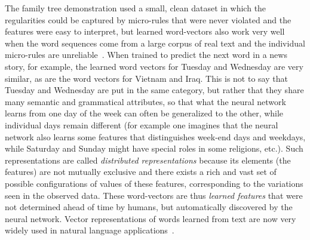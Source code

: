 \documentclass[10pts]{article}
\begin{document}
The family tree demonstration used a small, clean dataset in which the
regularities could be captured by micro-rules that were never violated
and the features were easy to interpret, but learned word-vectors also
work very well when the word sequences come from a large corpus of
real text and the individual micro-rules are
unreliable~\citep{BenDucVin01-short}. When trained to predict the next
word in a news story, for example, the learned word vectors for
Tuesday and Wednesday are very similar, as are the word vectors for
Vietnam and Iraq. This is not to say that Tuesday and Wednesday are
put in the same category, but rather that they share many semantic and
grammatical attributes, so that what the neural network learns from
one day of the week can often be generalized to the other, while
individual days remain different (for example one imagines that the
neural network also learns some features that distinguishes week-end
days and weekdays, while Saturday and Sunday might have special roles
in some religions, etc.).  Such representations are called {\em
  distributed representations} because its elements (the features) are
not mutually exclusive and there exists a rich and vast set of
possible configurations of values of these features, corresponding to
the variations seen in the observed data.  These word-vectors are thus
{\em learned features} that were not determined ahead of time by
humans, but automatically discovered by the neural network.  Vector
representations of words learned from text are now very widely used in
natural language
applications~\citep{Schwenk-2007,collobert:2011b,Socher-2011,
  Mikolov-et-al-NIPS2013,Bahdanau-et-al-arxiv2014,Sutskever-et-al-NIPS2014}.
\end{document}
